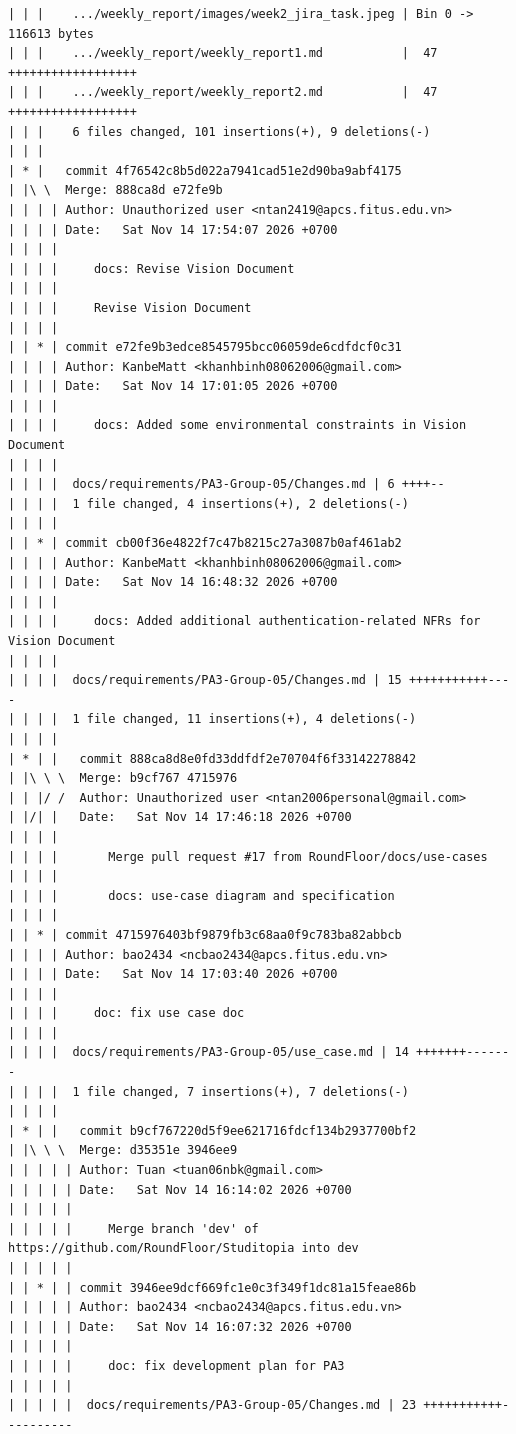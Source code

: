 \documentclass[12pt]{article}
\begin{document}
\begin{lstlisting}[numbers=none,breaklines=true]
| | |    .../weekly_report/images/week2_jira_task.jpeg | Bin 0 -> 116613 bytes
| | |    .../weekly_report/weekly_report1.md           |  47 ++++++++++++++++++
| | |    .../weekly_report/weekly_report2.md           |  47 ++++++++++++++++++
| | |    6 files changed, 101 insertions(+), 9 deletions(-)
| | |
| * |   commit 4f76542c8b5d022a7941cad51e2d90ba9abf4175
| |\ \  Merge: 888ca8d e72fe9b
| | | | Author: Unauthorized user <ntan2419@apcs.fitus.edu.vn>
| | | | Date:   Sat Nov 14 17:54:07 2026 +0700
| | | |
| | | |     docs: Revise Vision Document
| | | |
| | | |     Revise Vision Document
| | | |
| | * | commit e72fe9b3edce8545795bcc06059de6cdfdcf0c31
| | | | Author: KanbeMatt <khanhbinh08062006@gmail.com>
| | | | Date:   Sat Nov 14 17:01:05 2026 +0700
| | | |
| | | |     docs: Added some environmental constraints in Vision Document
| | | |
| | | |  docs/requirements/PA3-Group-05/Changes.md | 6 ++++--
| | | |  1 file changed, 4 insertions(+), 2 deletions(-)
| | | |
| | * | commit cb00f36e4822f7c47b8215c27a3087b0af461ab2
| | | | Author: KanbeMatt <khanhbinh08062006@gmail.com>
| | | | Date:   Sat Nov 14 16:48:32 2026 +0700
| | | |
| | | |     docs: Added additional authentication-related NFRs for Vision Document
| | | |
| | | |  docs/requirements/PA3-Group-05/Changes.md | 15 +++++++++++----
| | | |  1 file changed, 11 insertions(+), 4 deletions(-)
| | | |
| * | |   commit 888ca8d8e0fd33ddfdf2e70704f6f33142278842
| |\ \ \  Merge: b9cf767 4715976
| | |/ /  Author: Unauthorized user <ntan2006personal@gmail.com>
| |/| |   Date:   Sat Nov 14 17:46:18 2026 +0700
| | | |
| | | |       Merge pull request #17 from RoundFloor/docs/use-cases
| | | |
| | | |       docs: use-case diagram and specification
| | | |
| | * | commit 4715976403bf9879fb3c68aa0f9c783ba82abbcb
| | | | Author: bao2434 <ncbao2434@apcs.fitus.edu.vn>
| | | | Date:   Sat Nov 14 17:03:40 2026 +0700
| | | |
| | | |     doc: fix use case doc
| | | |
| | | |  docs/requirements/PA3-Group-05/use_case.md | 14 +++++++-------
| | | |  1 file changed, 7 insertions(+), 7 deletions(-)
| | | |
| * | |   commit b9cf767220d5f9ee621716fdcf134b2937700bf2
| |\ \ \  Merge: d35351e 3946ee9
| | | | | Author: Tuan <tuan06nbk@gmail.com>
| | | | | Date:   Sat Nov 14 16:14:02 2026 +0700
| | | | |
| | | | |     Merge branch 'dev' of https://github.com/RoundFloor/Studitopia into dev
| | | | |
| | * | | commit 3946ee9dcf669fc1e0c3f349f1dc81a15feae86b
| | | | | Author: bao2434 <ncbao2434@apcs.fitus.edu.vn>
| | | | | Date:   Sat Nov 14 16:07:32 2026 +0700
| | | | |
| | | | |     doc: fix development plan for PA3
| | | | |
| | | | |  docs/requirements/PA3-Group-05/Changes.md | 23 +++++++++++----------

\end{lstlisting}
\end{document}
